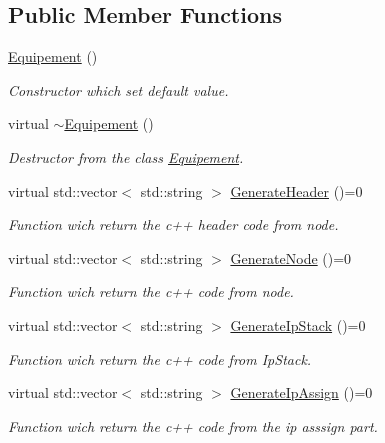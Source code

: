 \subsection*{Public Member Functions}
\begin{CompactItemize}
\item 
\hyperlink{class_equipement_9057a4777d006cbac4c72d09a8d09407}{Equipement} ()
\begin{CompactList}\small\item\em Constructor which set default value. \item\end{CompactList}\item 
virtual \hyperlink{class_equipement_e7751a52f2665d9e4b3e2cd6929bd986}{$\sim$Equipement} ()
\begin{CompactList}\small\item\em Destructor from the class \hyperlink{class_equipement}{Equipement}. \item\end{CompactList}\item 
virtual std::vector$<$ std::string $>$ \hyperlink{class_equipement_32d6f8201afca95d27be3f498cd7d312}{GenerateHeader} ()=0
\begin{CompactList}\small\item\em Function wich return the c++ header code from node. \item\end{CompactList}\item 
virtual std::vector$<$ std::string $>$ \hyperlink{class_equipement_df32ce167d648ff92a6420dea4e6f06e}{GenerateNode} ()=0
\begin{CompactList}\small\item\em Function wich return the c++ code from node. \item\end{CompactList}\item 
virtual std::vector$<$ std::string $>$ \hyperlink{class_equipement_6d7c3d74a18a723f35f274fb5aa5f06b}{GenerateIpStack} ()=0
\begin{CompactList}\small\item\em Function wich return the c++ code from IpStack. \item\end{CompactList}\item 
virtual std::vector$<$ std::string $>$ \hyperlink{class_equipement_643c6d9c56ed25c0319bfc84a6e064f5}{GenerateIpAssign} ()=0
\begin{CompactList}\small\item\em Function wich return the c++ code from the ip asssign part. \item\end{CompactList}\item 

\end{CompactItemize}
